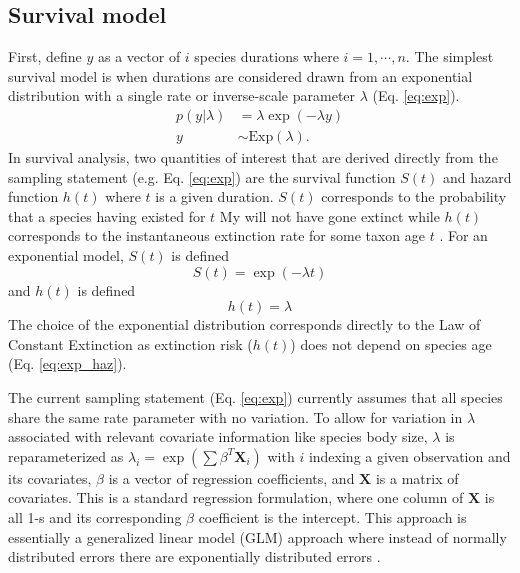 \documentclass[12pt,letterpaper]{article}
\begin{document}
\subsection{Survival model}

First, define \(y\) as a vector of \(i\) species durations where \(i = 1,\cdots,n\). The simplest survival model is when durations are considered drawn from an exponential distribution with a single rate or inverse-scale parameter \(\lambda\) (Eq. \ref{eq:exp}).
\begin{align}
  p(y | \lambda) &= \lambda \exp(-\lambda y) \nonumber \\
  y &\sim \mathrm{Exp}(\lambda).
  \label{eq:exp}
\end{align}
In survival analysis, two quantities of interest that are derived directly from the sampling statement (e.g. Eq. \ref{eq:exp}) are the survival function \(S(t)\) and hazard function \(h(t)\) where \(t\) is a given duration. \(S(t)\) corresponds to the probability that a species having existed for \(t\) My will not have gone extinct while \(h(t)\) corresponds to the instantaneous extinction rate for some taxon age \(t\) \citep{Klein2003}. For an exponential model, \(S(t)\) is defined
\begin{equation}
  S(t) = \exp(-\lambda t)
  \label{eq:exp_surv}
\end{equation}
and \(h(t)\) is defined
\begin{equation}
  h(t) = \lambda
  \label{eq:exp_haz}
\end{equation}
The choice of the exponential distribution corresponds directly to the Law of Constant Extinction \citep{VanValen1973} as extinction risk (\(h(t)\)) does not depend on species age (Eq. \ref{eq:exp_haz}).

The current sampling statement (Eq. \ref{eq:exp}) currently assumes that all species share the same rate parameter with no variation. To allow for variation in \(\lambda\) associated with relevant covariate information like species body size, \(\lambda\) is reparameterized as \(\lambda_{i} = \exp(\sum \beta^{T}\mathbf{X}_{i})\) with \(i\) indexing a given observation and its covariates, \(\beta\) is a vector of regression coefficients, and \(\mathbf{X}\) is a matrix of covariates. This is a standard regression formulation, where one column of \(\mathbf{X}\) is all 1-s and its corresponding \(\beta\) coefficient is the intercept. This approach is essentially a generalized linear model (GLM) approach where instead of normally distributed errors there are exponentially distributed errors \citep{Klein2003}.
\end{document}
